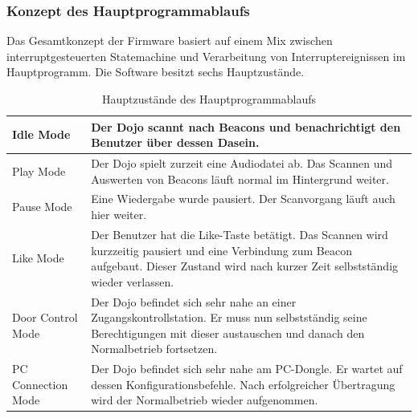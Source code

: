 \subsubsection{Konzept des Hauptprogrammablaufs}
Das Gesamtkonzept der Firmware basiert auf einem Mix zwischen interruptgesteuerten Statemachine und Verarbeitung von Interruptereignissen im Hauptprogramm. Die Software besitzt sechs Hauptzustände. 
\begin{table}[h]
  \centering
  \begin{tabular}{|p{4cm}|p{11cm}|}
    \hline
    Idle Mode & Der Dojo scannt nach Beacons und benachrichtigt den Benutzer über dessen Dasein.\\
    \hline
    Play Mode & Der Dojo spielt zurzeit eine Audiodatei ab. Das Scannen und Auswerten von Beacons läuft normal im Hintergrund weiter. \\
    \hline
    Pause Mode & Eine Wiedergabe wurde pausiert. Der Scanvorgang läuft auch hier weiter. \\
    \hline
    Like Mode & Der Benutzer hat die Like-Taste betätigt. Das Scannen wird kurzzeitig pausiert und eine Verbindung zum Beacon aufgebaut. Dieser Zustand wird nach kurzer Zeit selbstständig wieder verlassen. \\
    \hline
    Door Control Mode & Der Dojo befindet sich sehr nahe an einer Zugangskontrollstation. Er muss nun selbstständig seine Berechtigungen mit dieser austauschen und danach den Normalbetrieb fortsetzen. \\
    \hline
    PC Connection Mode & Der Dojo befindet sich sehr nahe am PC-Dongle. Er wartet auf dessen Konfigurationsbefehle. Nach erfolgreicher Übertragung wird der Normalbetrieb wieder aufgenommen.\\
    \hline
  \end{tabular}
  \caption{Hauptzustände des Hauptprogrammablaufs}\label{tab:BLE_2}
\end{table}

